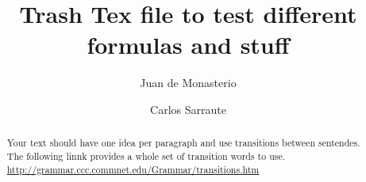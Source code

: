 \documentclass{article}%
\newcommand{\Expect}{{\mathbb{E}}}
\theoremstyle{definition}
\begin{document}
\title{Trash Tex file to test different formulas and stuff}




\author{
	Juan de Monasterio
	\and Carlos Sarraute
}

%
%


\maketitle
\begin{abstract}
	Your text should have one idea per paragraph and use transitions between sentendes. The following linnk provides a whole set of transition words to use.
	\url{http://grammar.ccc.commnet.edu/Grammar/transitions.htm}
	
	



\end{abstract} 

%	
\end{document}
